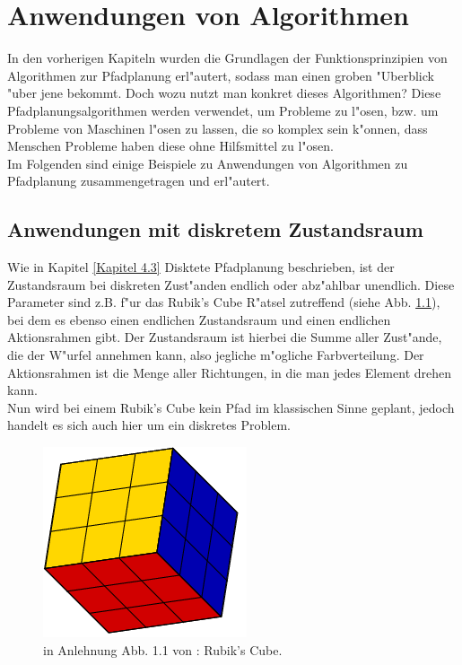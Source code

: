 \chapter{Anwendungen von Algorithmen}
In den vorherigen Kapiteln wurden die Grundlagen der Funktionsprinzipien von Algorithmen zur Pfadplanung erl"autert, sodass man einen groben "Uberblick "uber jene bekommt. Doch wozu nutzt man konkret dieses Algorithmen? Diese Pfadplanungsalgorithmen werden verwendet, um Probleme zu l"osen, bzw. um Probleme von Maschinen l"osen zu lassen, die so komplex sein k"onnen, dass Menschen Probleme haben diese ohne Hilfsmittel zu l"osen.\\
Im Folgenden sind einige Beispiele zu Anwendungen von Algorithmen zu Pfadplanung zusammengetragen und erl"autert.

\section{Anwendungen mit diskretem Zustandsraum}
Wie in Kapitel \ref{Kapitel 4.3} Disktete Pfadplanung beschrieben, ist der Zustandsraum bei diskreten Zust"anden endlich oder abz"ahlbar unendlich. Diese Parameter sind z.B. f"ur das Rubik's Cube R"atsel zutreffend (siehe Abb. \ref{Abb. 5.1}), bei dem es ebenso einen endlichen Zustandsraum und einen endlichen Aktionsrahmen gibt. Der Zustandsraum ist hierbei die Summe aller Zust"ande, die der W"urfel annehmen kann, also jegliche m"ogliche Farbverteilung. Der Aktionsrahmen ist die Menge aller Richtungen, in die man jedes Element drehen kann.\\ Nun wird bei einem Rubik's Cube kein Pfad im klassischen Sinne geplant, jedoch handelt es sich auch hier um ein diskretes Problem.\\
\begin{figure}
	\centering
	\includegraphics[width=0.4\linewidth]{images/img229}
	\caption{in Anlehnung Abb. 1.1 von \cite[~S. 5]{Lav06}: Rubik's Cube.}
	\label{Abb. 5.1}
\end{figure}


